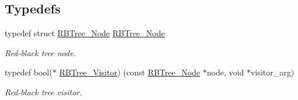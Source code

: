 \subsection*{Typedefs}
\begin{DoxyCompactItemize}
\item 
typedef struct \mbox{\hyperlink{structRBTree__Node}{R\+B\+Tree\+\_\+\+Node}} \mbox{\hyperlink{group__RTEMSScoreRBTree_ga36c440a9648ec535acfaaf4fd91d40ff}{R\+B\+Tree\+\_\+\+Node}}
\begin{DoxyCompactList}\small\item\em Red-\/black tree node. \end{DoxyCompactList}\item 
typedef bool($\ast$ \mbox{\hyperlink{group__RTEMSScoreRBTree_gade4e2c479a5f652c310ce39eac52d84b}{R\+B\+Tree\+\_\+\+Visitor}}) (const \mbox{\hyperlink{structRBTree__Node}{R\+B\+Tree\+\_\+\+Node}} $\ast$node, void $\ast$visitor\+\_\+arg)
\begin{DoxyCompactList}\small\item\em Red-\/black tree visitor. \end{DoxyCompactList}\end{DoxyCompactItemize}
